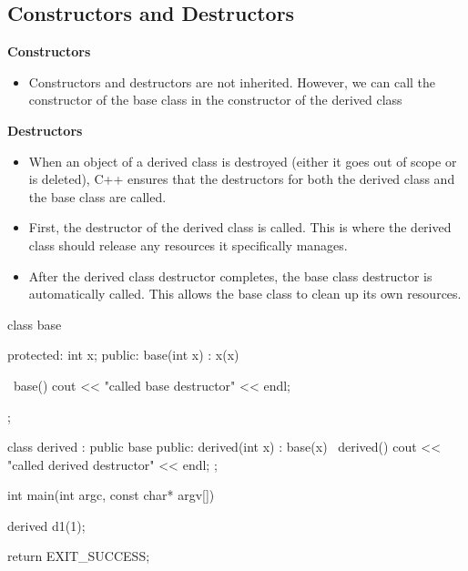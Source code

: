 \documentclass{report}
\begin{document}
    \pagebreak
    \subsection{Constructors and Destructors}
    \bigbreak \noindent 
    \begin{concept}
        \bigbreak \noindent 
        \textbf{Constructors}
    \begin{itemize}
       \item Constructors and destructors are not inherited. However, we can call the constructor of the base class in the constructor of the derived class
    \end{itemize} 
    \bigbreak \noindent 
    \textbf{Destructors}
    \begin{itemize}
        \item When an object of a derived class is destroyed (either it goes out of scope or is deleted), C++ ensures that the destructors for both the derived class and the base class are called.
        \item First, the destructor of the derived class is called. This is where the derived class should release any resources it specifically manages.
        \item After the derived class destructor completes, the base class destructor is automatically called. This allows the base class to clean up its own resources.
    \end{itemize}
    \end{concept}
    \bigbreak \noindent 
    \begin{cppcode}
        class base {
        protected:
            int x;
        public: 
            base(int x) : x(x) {}

            ~base() {
                cout << "called base destructor" << endl;
            }
        };

        class derived : public base {
        public: 
            derived(int x) : base(x) {}
            ~derived() {
                cout << "called derived destructor" << endl;
            }
        };

        int main(int argc, const char* argv[]) {

            derived d1(1);


            return EXIT_SUCCESS;
        }
    \end{cppcode}

    \pagebreak 
\end{document}
